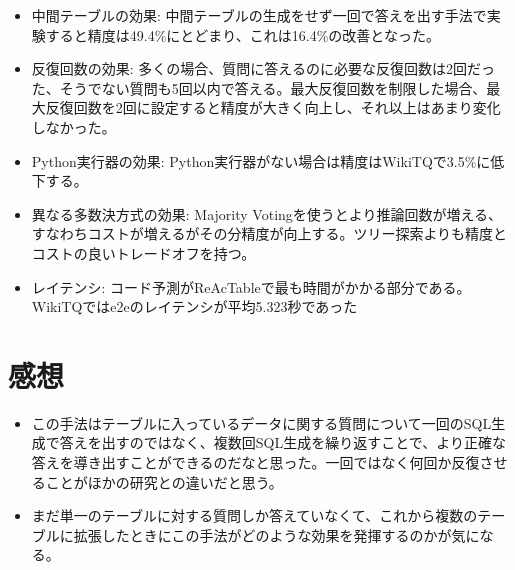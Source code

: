 \documentclass[dvipdfmx,uplatex]{jsarticle}
\theoremstyle{remark}
\newenvironment{experiment}[1]{
    \begin{tcolorbox}[
        colframe=violet,
        colback=violet!10!white,
        colbacktitle=violet!40!white,
        coltitle=black,
        fonttitle=\bfseries,
        title={#1}
    ]
}{
    \end{tcolorbox}
}
\newenvironment{kansou}{
    \begin{tcolorbox}[
        colframe=brown,
        colback=brown!10!white,
        colbacktitle=brown!40!white,
        coltitle=black,fonttitle=\bfseries
    ]
}{
    \end{tcolorbox}
}
\begin{document}
\begin{experiment}{ReAcTableの分析}
\begin{itemize}
    \item 中間テーブルの効果: 中間テーブルの生成をせず一回で答えを出す手法で実験すると精度は49.4\%にとどまり、これは16.4\%の改善となった。
    \item 反復回数の効果: 多くの場合、質問に答えるのに必要な反復回数は2回だった、そうでない質問も5回以内で答える。最大反復回数を制限した場合、最大反復回数を2回に設定すると精度が大きく向上し、それ以上はあまり変化しなかった。
    \item Python実行器の効果: Python実行器がない場合は精度はWikiTQで3.5\%に低下する。
    \item 異なる多数決方式の効果: Majority Votingを使うとより推論回数が増える、すなわちコストが増えるがその分精度が向上する。ツリー探索よりも精度とコストの良いトレードオフを持つ。
    \item レイテンシ: コード予測がReAcTableで最も時間がかかる部分である。WikiTQではe2eのレイテンシが平均5.323秒であった
\end{itemize}
\end{experiment}

\section{感想}
\begin{kansou}
\begin{itemize}
  \item この手法はテーブルに入っているデータに関する質問について一回のSQL生成で答えを出すのではなく、複数回SQL生成を繰り返すことで、より正確な答えを導き出すことができるのだなと思った。一回ではなく何回か反復させることがほかの研究との違いだと思う。
  \item まだ単一のテーブルに対する質問しか答えていなくて、これから複数のテーブルに拡張したときにこの手法がどのような効果を発揮するのかが気になる。
\end{itemize}
\end{kansou}



\end{document}
